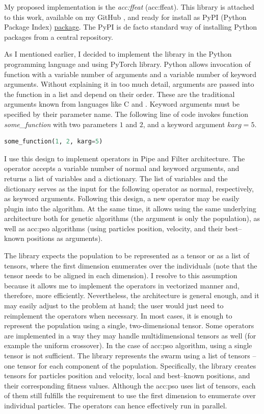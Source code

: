 My proposed implementation is the \emph{\acrlong{acc:ffeat}} (\acrshort{acc:ffeat}). This library is attached to this work, available on my GitHub \citep{FFEATrepo}, and ready for install as PyPI (Python Package Index) \href{https://pypi.org/project/FFEAT/}{package}. The PyPI is de facto standard way of installing Python packages from a central repository.

As I mentioned earlier, I decided to implement the library in the Python programming language and using PyTorch library. Python allows invocation of function with a variable number of arguments and a variable number of keyword arguments. Without explaining it in too much detail, arguments are passed into the function in a list and depend on their order. These are the traditional arguments known from languages like C and \cppns. Keyword arguments must be specified by their parameter name. The following line of code invokes function \textit{some\_function} with two parameters $1$ and $2$, and a keyword argument $karg=5$.

\begin{lstlisting}[language=Python]
some_function(1, 2, karg=5)
\end{lstlisting}

I use this design to implement operators in Pipe and Filter architecture. The operator accepts a variable number of normal and keyword arguments, and returns a list of variables and a dictionary. The list of variables and the dictionary serves as the input for the following operator as normal, respectively, as keyword arguments. Following this design, a new operator may be easily plug\-in into the algorithm. At the same time, it allows using the same underlying architecture both for genetic algorithms (the argument is only the population), as well as \acrshort{acc:pso} algorithms (using particles position, velocity, and their best--known positions as arguments).

The library expects the population to be represented as a tensor or as a list of tensors, where the first dimension enumerates over the individuals (note that the tensor needs to be aligned in each dimension). I resolve to this assumption because it allows me to implement the operators in vectorized manner and, therefore, more efficiently. Nevertheless, the architecture is general enough, and it may easily adjust to the problem at hand; the user would just need to reimplement the operators when necessary. In most cases, it is enough to represent the population using a single, two-dimensional tensor. Some operators are implemented in a way they may handle multidimensional tensors as well (for example the uniform crossover). In the case of \acrshort{acc:pso} algorithm, using a single tensor is not sufficient. The library represents the swarm using a list of tensors -- one tensor for each component of the population. Specifically, the library creates tensors for particles position and velocity, local and best--known positions, and their corresponding fitness values. Although the \acrshort{acc:pso} uses list of tensors, each of them still fulfills the requirement to use the first dimension to enumerate over individual particles. The operators can hence effectively run in parallel.

